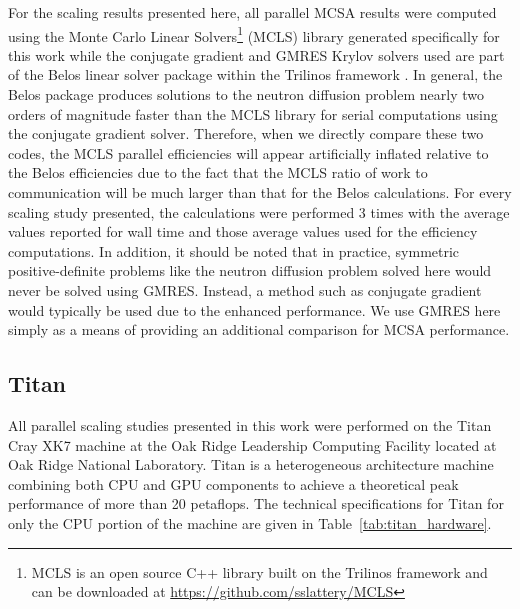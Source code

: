 For the scaling results presented here, all parallel MCSA results were
computed using the Monte Carlo Linear Solvers\footnote{MCLS is an open
  source C++ library built on the Trilinos framework and can be
  downloaded at \url{https://github.com/sslattery/MCLS}} (MCLS)
library generated specifically for this work while the conjugate
gradient and GMRES Krylov solvers used are part of the Belos linear
solver package within the Trilinos framework
\citep{heroux_overview_2005}. In general, the Belos package produces
solutions to the neutron diffusion problem nearly two orders of
magnitude faster than the MCLS library for serial computations using
the conjugate gradient solver. Therefore, when we directly compare
these two codes, the MCLS parallel efficiencies will appear
artificially inflated relative to the Belos efficiencies due to the
fact that the MCLS ratio of work to communication will be much larger
than that for the Belos calculations. For every scaling study
presented, the calculations were performed 3 times with the average
values reported for wall time and those average values used for the
efficiency computations. In addition, it should be noted that in
practice, symmetric positive-definite problems like the neutron
diffusion problem solved here would never be solved using
GMRES. Instead, a method such as conjugate gradient would typically be
used due to the enhanced performance. We use GMRES here simply as a
means of providing an additional comparison for MCSA performance.

\subsection{Titan }
\label{subsec:titan}
All parallel scaling studies presented in this work were performed on
the Titan Cray XK7 machine at the Oak Ridge Leadership Computing
Facility located at Oak Ridge National Laboratory. Titan is a
heterogeneous architecture machine combining both CPU and GPU
components to achieve a theoretical peak performance of more than 20
petaflops. The technical specifications for Titan for only the CPU
portion of the machine are given in Table~\ref{tab:titan_hardware}.

